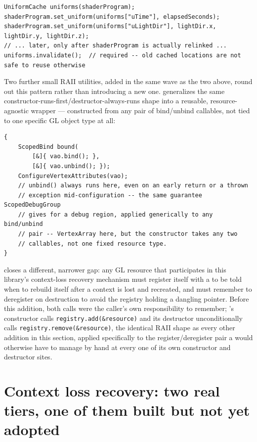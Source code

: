 \begin{lstlisting}
UniformCache uniforms(shaderProgram);
shaderProgram.set_uniform(uniforms["uTime"], elapsedSeconds);
shaderProgram.set_uniform(uniforms["uLightDir"], lightDir.x, lightDir.y, lightDir.z);
// ... later, only after shaderProgram is actually relinked ...
uniforms.invalidate();  // required -- old cached locations are not safe to reuse otherwise
\end{lstlisting}

Two further small RAII utilities, added in the same wave as the two above, round out this
pattern rather than introducing a new one.  generalizes the same
constructor-runs-first/destructor-always-runs shape into a reusable, resource-agnostic
wrapper --- constructed from any pair of bind/unbind callables, not tied to one specific GL
object type at all:

\begin{lstlisting}
{
    ScopedBind bound(
        [&]{ vao.bind(); },
        [&]{ vao.unbind(); });
    ConfigureVertexAttributes(vao);
    // unbind() always runs here, even on an early return or a thrown
    // exception mid-configuration -- the same guarantee ScopedDebugGroup
    // gives for a debug region, applied generically to any bind/unbind
    // pair -- VertexArray here, but the constructor takes any two
    // callables, not one fixed resource type.
}
\end{lstlisting}

 closes a different, narrower gap: any GL resource that
participates in this library's context-loss recovery mechanism must register itself with a
 to be told when to rebuild itself after a context is lost and
recreated, and must remember to deregister on destruction to avoid the registry holding a
dangling pointer. Before this addition, both calls were the caller's own responsibility to
remember; 's constructor calls \texttt{registry.add(\&resource)}
and its destructor unconditionally calls \texttt{registry.remove(\&resource)}, the identical
RAII shape as every other addition in this section, applied specifically to the
register/deregister pair a  would otherwise have to manage by
hand at every one of its own constructor and destructor sites.

\section{Context loss recovery: two real tiers, one of them built but not yet adopted}


